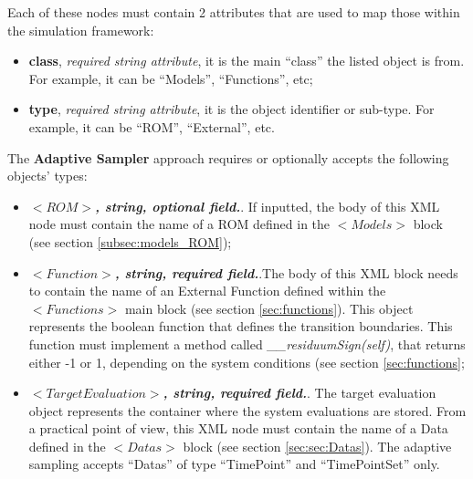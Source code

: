 \begin{itemize}
Each of these nodes  must contain 2 attributes that are used to map those within the simulation framework:
   \begin{itemize}
     \item \textbf{class}, \textit{required string attribute}, it is the main ``class'' the listed object is from. For example, it can be ``Models'', ``Functions'', etc;
     \item \textbf{type},  \textit{required string attribute}, it is the object identifier or sub-type. For example, it can be ``ROM'', ``External'', etc.
    \end{itemize}
The \textbf{Adaptive Sampler} approach requires or optionally accepts the following objects' types:
   \begin{itemize}
     \item $<ROM>$\textbf{\textit{, string, optional  field.}}. If inputted, the body of this XML node must contain the name of a ROM defined in the $<Models>$ block (see section \ref{subsec:models_ROM});
       \item $<Function>$\textbf{\textit{, string, required field.}}.The body of this XML block needs to contain the name of an External Function defined within the $<Functions>$ main block (see section \ref{sec:functions}). This object represents the boolean function that defines the transition boundaries. This function must implement a method called \textit{\_\_residuumSign(self)}, that returns either -1 or 1, depending on the system conditions (see section \ref{sec:functions};
        \item $<TargetEvaluation>$\textbf{\textit{, string, required field.}}. The target evaluation object represents the container where the system evaluations are stored. From a practical point of view, this XML node must contain the name of a Data defined in the $<Datas>$ block (see section \ref{sec:sec:Datas}). The adaptive sampling accepts ``Datas'' of type ``TimePoint''  and ``TimePointSet'' only.
    \end{itemize}

\end{itemize}



